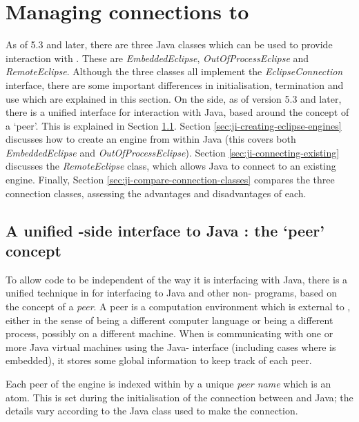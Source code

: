 \section{Managing connections to {\eclipse}}
\label{sec:ji-managing-eclipse-connections}
As of {\eclipse} 5.3 and later, there are three Java classes which can be
used to provide interaction with {\eclipse}. These are {\it
EmbeddedEclipse}, {\it OutOfProcessEclipse}
and {\it RemoteEclipse}. Although the three
classes all implement the {\it EclipseConnection}  interface, there are some important differences in
initialisation, termination and use which are explained in this section. On
the {\eclipse} side, as of version 5.3 and later, there is a unified
interface for interaction with Java, based around the concept of a
`peer'. This is explained in Section
\ref{sec:ji-peer-concept}. Section
\ref{sec:ji-creating-eclipse-engines} discusses how to create an
{\eclipse} engine from within Java (this covers both {\it
EmbeddedEclipse} and {\it OutOfProcessEclipse}). Section
\ref{sec:ji-connecting-existing} discusses the {\it RemoteEclipse}
class, which allows Java to connect to an existing {\eclipse}
engine. Finally, Section \ref{sec:ji-compare-connection-classes}
compares the three connection classes, assessing the advantages and
disadvantages of each.

\subsection{A unified {\eclipse}-side interface to Java : the `peer' concept}
\label{sec:ji-peer-concept}

To allow {\eclipse} code to be independent of the way it is
interfacing with Java, there is a unified technique in {\eclipse} for
interfacing to Java and other non-{\eclipse} programs, based on the
concept of a {\it peer}. A peer is a computation environment which is
external to {\eclipse}, either in the sense of being a different
computer language or being a different process, possibly on a
different machine. When {\eclipse} is communicating with one or more
Java virtual machines using the Java-{\eclipse} interface (including
cases where {\eclipse} is embedded), it stores some global information
to keep track of each peer.

Each peer of the {\eclipse} engine is indexed within {\eclipse}
by a unique {\it peer name} which is an atom. This is set during the
initialisation of the connection between {\eclipse} and Java; the
details vary according to the Java class used to make the connection.

